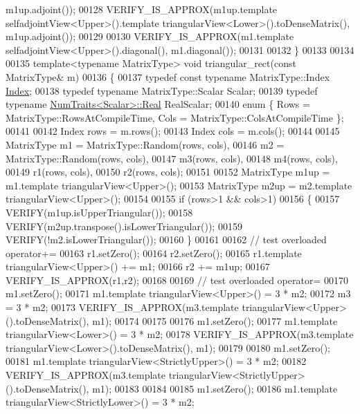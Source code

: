 \begin{DoxyCode}
      m1up.adjoint());
00128   VERIFY\_IS\_APPROX(m1up.template selfadjointView<Upper>().template triangularView<Lower>().toDenseMatrix(),
       m1up.adjoint());
00129 
00130   VERIFY\_IS\_APPROX(m1.template selfadjointView<Upper>().diagonal(), m1.diagonal());
00131 
00132 \}
00133 
00134 
00135 \textcolor{keyword}{template}<\textcolor{keyword}{typename} MatrixType> \textcolor{keywordtype}{void} triangular\_rect(\textcolor{keyword}{const} MatrixType& m)
00136 \{
00137   \textcolor{keyword}{typedef} \textcolor{keyword}{const} \textcolor{keyword}{typename} MatrixType::Index \hyperlink{namespace_eigen_a62e77e0933482dafde8fe197d9a2cfde}{Index};
00138   \textcolor{keyword}{typedef} \textcolor{keyword}{typename} MatrixType::Scalar Scalar;
00139   \textcolor{keyword}{typedef} \textcolor{keyword}{typename} \hyperlink{group___core___module_struct_eigen_1_1_num_traits}{NumTraits<Scalar>::Real} RealScalar;
00140   \textcolor{keyword}{enum} \{ Rows =  MatrixType::RowsAtCompileTime, Cols =  MatrixType::ColsAtCompileTime \};
00141 
00142   Index rows = m.rows();
00143   Index cols = m.cols();
00144 
00145   MatrixType m1 = MatrixType::Random(rows, cols),
00146              m2 = MatrixType::Random(rows, cols),
00147              m3(rows, cols),
00148              m4(rows, cols),
00149              r1(rows, cols),
00150              r2(rows, cols);
00151 
00152   MatrixType m1up = m1.template triangularView<Upper>();
00153   MatrixType m2up = m2.template triangularView<Upper>();
00154 
00155   \textcolor{keywordflow}{if} (rows>1 && cols>1)
00156   \{
00157     VERIFY(m1up.isUpperTriangular());
00158     VERIFY(m2up.transpose().isLowerTriangular());
00159     VERIFY(!m2.isLowerTriangular());
00160   \}
00161 
00162   \textcolor{comment}{// test overloaded operator+=}
00163   r1.setZero();
00164   r2.setZero();
00165   r1.template triangularView<Upper>() +=  m1;
00166   r2 += m1up;
00167   VERIFY\_IS\_APPROX(r1,r2);
00168 
00169   \textcolor{comment}{// test overloaded operator=}
00170   m1.setZero();
00171   m1.template triangularView<Upper>() = 3 * m2;
00172   m3 = 3 * m2;
00173   VERIFY\_IS\_APPROX(m3.template triangularView<Upper>().toDenseMatrix(), m1);
00174 
00175 
00176   m1.setZero();
00177   m1.template triangularView<Lower>() = 3 * m2;
00178   VERIFY\_IS\_APPROX(m3.template triangularView<Lower>().toDenseMatrix(), m1);
00179 
00180   m1.setZero();
00181   m1.template triangularView<StrictlyUpper>() = 3 * m2;
00182   VERIFY\_IS\_APPROX(m3.template triangularView<StrictlyUpper>().toDenseMatrix(), m1);
00183 
00184 
00185   m1.setZero();
00186   m1.template triangularView<StrictlyLower>() = 3 * m2;

\end{DoxyCode}
